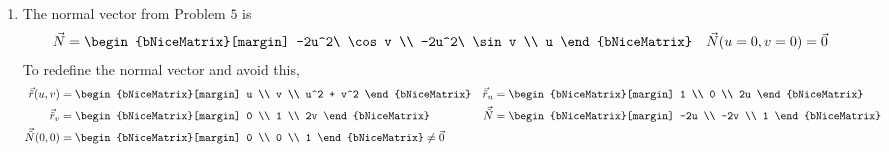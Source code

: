 \begin{enumerate}
    \item The normal vector from Problem $ 5 $ is
          \begin{align}
              \vec{N} & = \begin{bNiceMatrix}[margin]
                              -2u^2\ \cos v \\ -2u^2\ \sin v \\ u
                          \end{bNiceMatrix} &
              \vec{N}(u = 0, v = 0) = \vec{0}
          \end{align}
          To redefine the normal vector and avoid this,
          \begin{align}
              \vec{\tilde{r}}(u, v) & = \begin{bNiceMatrix}[margin]
                                            u \\ v \\ u^2 + v^2
                                        \end{bNiceMatrix}  &
              \vec{\tilde{r}}_u     & = \begin{bNiceMatrix}[margin]
                                            1 \\ 0 \\ 2u
                                        \end{bNiceMatrix}     \\
              \vec{\tilde{r}}_v     & = \begin{bNiceMatrix}[margin]
                                            0 \\ 1 \\ 2v
                                        \end{bNiceMatrix}  &
              \vec{\tilde{N}}       & = \begin{bNiceMatrix}[margin]
                                            -2u \\ -2v \\ 1
                                        \end{bNiceMatrix}     \\
              \vec{\tilde{N}}(0, 0) & = \begin{bNiceMatrix}[margin]
                                            0 \\ 0 \\ 1
                                        \end{bNiceMatrix} \neq \vec{0}
          \end{align}


\end{enumerate}
